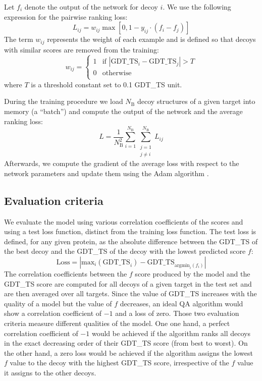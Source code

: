 \documentclass{bioinfo}
\begin{document}
Let $f_i$ denote the output of the network for decoy $i$. We use the
following expression for the pairwise ranking loss:
\begin{equation}
L_{ij} = w_{ij} \max \left[ 0, 1 - y_{ij} \cdot (f_i - f_j) \right]
\end{equation}
The term $w_{ij}$ represents the weight of each example and is defined
so that decoys with similar scores are removed from the training:
\begin{equation}
w_{ij} = \begin{cases}
               1& \text{if } \left| \text{GDT\_TS}_i - \text{GDT\_TS}_j \right| > T \\
               0& \text{otherwise} \\ 
            \end{cases}
\end{equation}
where $T$ is a threshold constant set to 0.1 GDT\_TS unit.

During the training procedure we load $N_\text{B}$ decoy structures of
a given target into memory (a ``batch'') and compute the output of the
network and the average ranking loss:
\begin{equation}
L = \frac{1}{N_\text{B}^2} \sum_{i=1}^{N_\text{B}}\sum_{\substack{j=1\\j\neq i}}^{N_\text{B}} L_{ij}
\end{equation}
Afterwards, we compute the gradient of the average loss with respect
to the network parameters and update them using the Adam algorithm
\citep{kingma2014adam}.
%
\subsection{Evaluation criteria}
We evaluate the model using various correlation coefficients of the
scores and using a test loss function, distinct from the training loss
function. The test loss is defined, for any given protein, as the
absolute difference between the GDT\_TS of the best decoy and the
GDT\_TS of the decoy with the lowest predicted score $f$:
\begin{equation}
\mathrm{Loss} = \left| \mathrm{max}_i(\text{GDT\_TS}_i) - \text{GDT\_TS}_{\mathrm{argmin}_i(f_i)} \right|
\end{equation}
The correlation coefficients between the $f$ score produced by the
model and the GDT\_TS score are computed for all decoys of a given
target in the test set and are then averaged over all targets. Since
the value of GDT\_TS increases with the quality of a model but the
value of $f$ decreases, an ideal QA algorithm would show a correlation
coefficient of $-1$ and a loss of zero.
%
Those two evaluation criteria measure different qualities of the
model. One one hand, a perfect correlation coefficient of $-1$ would
be achieved if the algorithm ranks all decoys in the exact decreasing
order of their GDT\_TS score (from best to worst). On the other hand,
a zero loss would be achieved if the algorithm assigns the lowest $f$
value to the decoy with the highest GDT\_TS score, irrespective of the
$f$ value it assigns to the other decoys.
%
%
\end{document}
